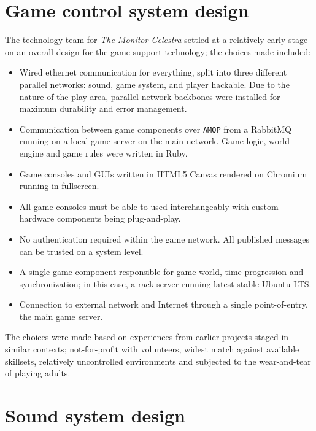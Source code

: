 
\section{Game control system design}
\label{sec:game-control-system}

The technology team for \emph{The Monitor Celestra} settled at a
relatively early stage on an overall design for the game support
technology; the choices made included: 
\begin{itemize}
\item Wired ethernet communication for everything, split into three
  different parallel networks: sound, game system, and player hackable. Due to the nature of the 
  play area, parallel network backbones were installed for maximum durability and error management.
\item Communication between game components over \texttt{AMQP} from a RabbitMQ running on a local
game server on the main network. Game logic, world engine and game rules were written in Ruby.
\item Game consoles and GUIs written in HTML5 Canvas rendered on Chromium running in fullscreen.
\item All game consoles must be able to used interchangeably with custom hardware components being plug-and-play.
\item No authentication required within the game network. All published messages can be trusted on a system level. 
\item A single game component responsible for game world, time progression and synchronization; in this case, a rack server running latest stable Ubuntu LTS\@.
\item Connection to external network and Internet through a single point-of-entry, the main game server.
\end{itemize}

The choices were made based on experiences from earlier projects staged
in similar contexts; not-for-profit with volunteers, widest match against available skillsets, relatively uncontrolled environments
and subjected to the wear-and-tear of playing adults. 


\section{Sound system design}
\label{sec:sound-system-design}

